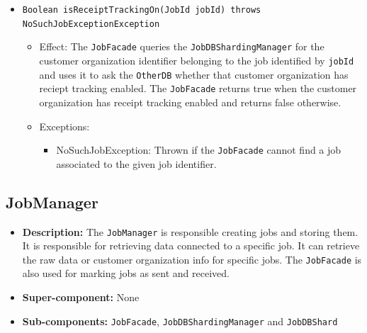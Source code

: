 \documentclass[a4paper,10pt]{article}
\begin{document}
\begin{itemize}
\begin{itemize}
    	\item \texttt{Boolean isReceiptTrackingOn(JobId jobId) throws NoSuchJobExceptionException}
    	\begin{itemize}
    		\item Effect: The \texttt{JobFacade} queries the \texttt{JobDBShardingManager} for the customer organization identifier belonging to the job identified by \texttt{jobId} and uses it to ask the \texttt{OtherDB} whether that customer organization has reciept tracking enabled. The \texttt{JobFacade} returns true when the customer organization has receipt tracking enabled and returns false otherwise.
    		\item Exceptions:
    		\begin{itemize}
    			\item NoSuchJobException: Thrown if the \texttt{JobFacade} cannot find a job associated to the given job identifier.
    		\end{itemize}
    	\end{itemize}
 	
    	
    \end{itemize}
\end{itemize}

\subsection{JobManager}
\begin{itemize}
    \item \textbf{Description:} The \texttt{JobManager} is responsible creating jobs and storing them. It is responsible for retrieving data connected to a specific job. It can retrieve the raw data or customer organization info for specific jobs. The \texttt{JobFacade} is also used for marking jobs as sent and received.
    \item \textbf{Super-component:} None
    \item \textbf{Sub-components:} \texttt{JobFacade}, \texttt{JobDBShardingManager} and \texttt{JobDBShard}
\end{itemize}
\end{document}
